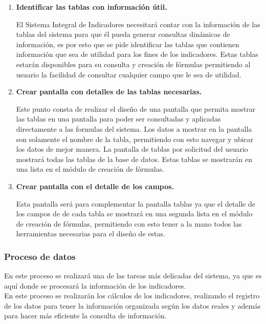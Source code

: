 		    	\begin{enumerate}[1.]
		    		\item \textbf{Identificar las tablas con informaci\'on \'util.}

		    			El Sistema Integral de Indicadores necesitar\'a contar con la informaci\'on de las tablas del sistema para que \'el pueda generar consultas din\'amicas de informaci\'on, es por esto que se pide identificar las tablas que contienen informaci\'on que sea de utilidad para los fines de los indicadores.
		    			Estas tablas estar\'an disponibles para su consulta y creaci\'on de f\'ormulas permitiendo al usuario la facilidad de consultar cualquier campo que le sea de utilidad.
		    		\item \textbf{Crear pantalla con detalles de las tablas necesarias.}

		    			Este punto consta de realizar el dise\~no de una pantalla  que permita mostrar las tablas en una pantalla para poder ser consultadas y aplicadas directamente a las formulas del sistema.
						Los datos a mostrar en la pantalla son solamente el nombre de la tabla, permitiendo con esto navegar y ubicar los datos de mejor manera. La pantalla de tablas por solicitud del usuario mostrar\'a todas las tablas de la base de datos.
						Estas tablas se mostrar\'an en una lista en el m\'odulo de creaci\'on de f\'ormulas.
					\item \textbf{Crear pantalla con el detalle de los campos.}

						Esta pantalla ser\'a para complementar la pantalla tablas ya que el detalle de los campos de de cada tabla se mostrar\'a en una segunda lista en el m\'odulo de creaci\'on de f\'ormulas, permitiendo con esto tener a la mano todos las herramientas necesarias para el dise\~no de estas.

		    	\end{enumerate}

		    \subsubsection{Proceso de datos}

		    	En este proceso se realizar\'a una de las tareas m\'as delicadas del sistema, ya que es aqu\'i donde se procesar\'a la informaci\'on de los indicadores.\\

				En este proceso se realizar\'an los c\'alculos de los indicadores, realizando el registro de los datos para tener la informaci\'on organizada seg\'un los datos reales y adem\'as para hacer m\'as eficiente la consulta de informaci\'on.\\

